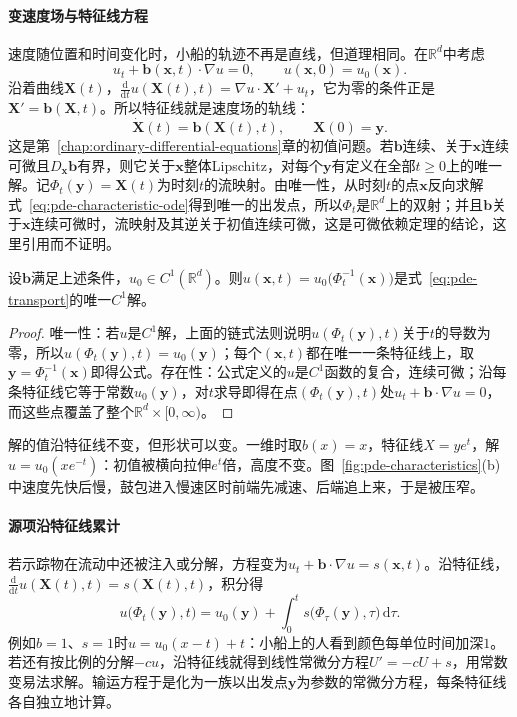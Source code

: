 \paragraph{变速度场与特征线方程}
速度随位置和时间变化时，小船的轨迹不再是直线，但道理相同。在$\mathbb R^d$中考虑
\begin{equation}
  u_t+\bm b(\bm x,t)\cdot\nabla u=0,\qquad u(\bm x,0)=u_0(\bm x).
  \label{eq:pde-transport}
\end{equation}
沿着曲线$\bm X(t)$，$\frac{\mathrm d}{\mathrm dt}u(\bm X(t),t)=\nabla u\cdot\bm X'+u_t$，它为零的条件正是$\bm X'=\bm b(\bm X,t)$。所以特征线就是速度场的轨线：
\begin{equation}
  \dot{\bm X}(t)=\bm b(\bm X(t),t),\qquad\bm X(0)=\bm y .
  \label{eq:pde-characteristic-ode}
\end{equation}
这是第~\ref{chap:ordinary-differential-equations}章的初值问题。若$\bm b$连续、关于$\bm x$连续可微且$D_{\bm x}\bm b$有界，则它关于$\bm x$整体Lipschitz，对每个$\bm y$有定义在全部$t\geq0$上的唯一解。记$\Phi_t(\bm y)=\bm X(t)$为时刻$t$的流映射。由唯一性，从时刻$t$的点$\bm x$反向求解式~\eqref{eq:pde-characteristic-ode}得到唯一的出发点，所以$\Phi_t$是$\mathbb R^d$上的双射；并且$\bm b$关于$\bm x$连续可微时，流映射及其逆关于初值连续可微，这是可微依赖定理的结论，这里引用而不证明。

\begin{theorem}[输运方程的特征线解]
\label{thm:pde-transport-characteristics}
设$\bm b$满足上述条件，$u_0\in C^1(\mathbb R^d)$。则$u(\bm x,t)=u_0\bigl(\Phi_t^{-1}(\bm x)\bigr)$是式~\eqref{eq:pde-transport}的唯一$C^1$解。
\end{theorem}

\begin{proof}
唯一性：若$u$是$C^1$解，上面的链式法则说明$u(\Phi_t(\bm y),t)$关于$t$的导数为零，所以$u(\Phi_t(\bm y),t)=u_0(\bm y)$；每个$(\bm x,t)$都在唯一一条特征线上，取$\bm y=\Phi_t^{-1}(\bm x)$即得公式。存在性：公式定义的$u$是$C^1$函数的复合，连续可微；沿每条特征线它等于常数$u_0(\bm y)$，对$t$求导即得在点$(\Phi_t(\bm y),t)$处$u_t+\bm b\cdot\nabla u=0$，而这些点覆盖了整个$\mathbb R^d\times[0,\infty)$。
\end{proof}

解的值沿特征线不变，但形状可以变。一维时取$b(x)=x$，特征线$X=ye^t$，解$u=u_0(xe^{-t})$：初值被横向拉伸$e^t$倍，高度不变。图~\ref{fig:pde-characteristics}(b)中速度先快后慢，鼓包进入慢速区时前端先减速、后端追上来，于是被压窄。

\paragraph{源项沿特征线累计}
若示踪物在流动中还被注入或分解，方程变为$u_t+\bm b\cdot\nabla u=s(\bm x,t)$。沿特征线，$\frac{\mathrm d}{\mathrm dt}u(\bm X(t),t)=s(\bm X(t),t)$，积分得
\[
  u\bigl(\Phi_t(\bm y),t\bigr)=u_0(\bm y)+\int_0^ts\bigl(\Phi_\tau(\bm y),\tau\bigr)\,\mathrm d\tau .
\]
例如$b=1$、$s=1$时$u=u_0(x-t)+t$：小船上的人看到颜色每单位时间加深$1$。若还有按比例的分解$-cu$，沿特征线就得到线性常微分方程$U'=-cU+s$，用常数变易法求解。输运方程于是化为一族以出发点$\bm y$为参数的常微分方程，每条特征线各自独立地计算。

